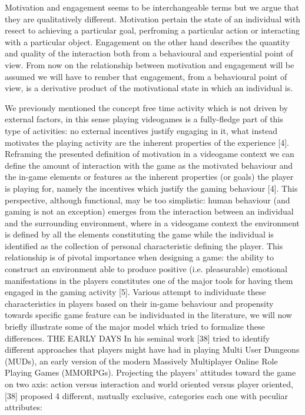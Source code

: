 Motivation and engagement seems to be interchangeable terms but we argue that they are qualitatively different. Motivation pertain the state of an individual with resect to achieving a particular goal, perfroming a particular action or interacting with a particular object. Engagement on the other hand describes the quantity and quality of the interaction both from a behavioural and experiential point of view. From now on the relationship between motivation and engagement will be assumed we will have to rember that engagement, from a behavioural point of view, is a derivative product of the motivational state in which an individual is. 

We previously mentioned the concept free time activity which is not driven by external factors, in this sense playing videogames is a fully-fledge part of this type of activities: no external incentives justify engaging in it, what instead motivates the playing activity are the inherent properties of the experience [4]. Reframing the presented definition of motivation in a videogame context we can define the amount of interaction with the game as the motivated behaviour and the in-game elements or features as the inherent properties (or goals) the player is playing for, namely the incentives which justify the gaming behaviour [4]. This perspective, although functional, may be too simplistic: human behaviour (and gaming is not an exception) emerges from the interaction between an individual and the surrounding environment, where in a videogame context the environment is defined by all the elements constituting the game while the individual is identified as the collection of personal characteristic defining the player. This relationship is of pivotal importance when designing a game: the ability to construct an environment able to produce positive (i.e. pleasurable) emotional manifestations in the players constitutes one of the major tools for having them engaged in the gaming activity [5]. Various attempt to individuate these characteristics in players based on their in-game behaviour and propensity towards specific game feature can be individuated in the literature, we will now briefly illustrate some of the major model which tried to formalize these differences.
THE EARLY DAYS
In his seminal work [38] tried to identify different approaches that players might have had in playing Multi User Dungeons (MUDs), an early version of the modern Massively Multiplayer Online Role Playing Games (MMORPGs). Projecting the players’ attitudes toward the game on two axis: action versus interaction and world oriented versus player oriented, [38] proposed 4 different, mutually exclusive, categories each one with peculiar attributes:
